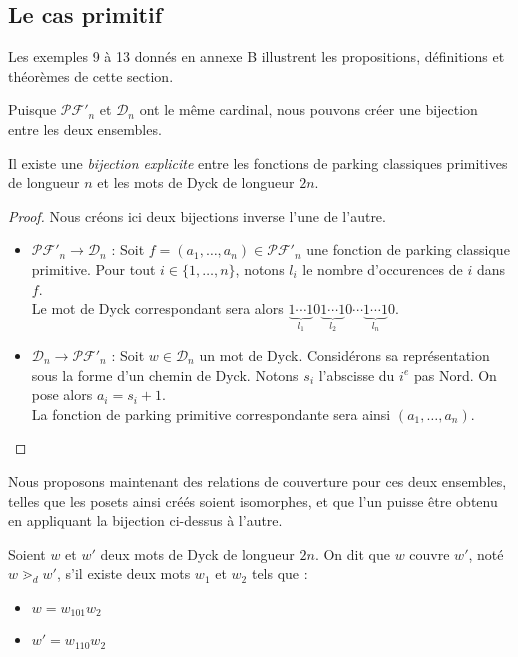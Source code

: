 \subsection{Le cas primitif}

Les exemples 9 à 13 donnés en annexe B illustrent les propositions,
définitions et théorèmes de cette section.

Puisque $\mathcal{PF'}_n$ et $\mathcal{D}_n$ ont le même cardinal,
nous pouvons créer une bijection entre les deux ensembles.

\begin{prop}
    Il existe une \emph{bijection explicite} entre les fonctions de parking
    classiques primitives de longueur $n$ et les mots de Dyck de
    longueur $2n$.
\end{prop}

\begin{proof}
    Nous créons ici deux bijections inverse l'une de l'autre.
\begin{itemize}
    \item $\mathcal{PF'}_n \to \mathcal{D}_n$ :
    Soit $f = (a_1, \ldots, a_n) \in \mathcal{PF'}_n$
    une fonction de parking classique primitive.
    Pour tout $i \in \{1, \ldots, n\}$, notons $l_i$ le nombre
    d'occurences de $i$ dans $f$.\\
    Le mot de Dyck correspondant sera alors
    $\underbrace{1 \cdots 1}_{l_1}0
     \underbrace{1 \cdots 1}_{l_2}0 \cdots
     \underbrace{1 \cdots 1}_{l_n}0$.
    
    \item $\mathcal{D}_n \to \mathcal{PF'}_n$ :
    Soit $w \in \mathcal{D}_n$ un mot de Dyck. Considérons sa
    représentation sous la forme d'un chemin de Dyck.
    Notons $s_i$ l'abscisse du $i^{e}$ pas Nord.
    On pose alors $a_i = s_i + 1$.\\
    La fonction de parking primitive correspondante sera ainsi
    $(a_1, \ldots, a_n)$.
\end{itemize}
\end{proof}

Nous proposons maintenant des relations de couverture pour ces deux
ensembles, telles que les posets ainsi créés soient isomorphes, et que 
l'un puisse être obtenu en appliquant la bijection ci-dessus à l'autre.

\begin{definition}[$\gtrdot_d$]
    Soient $w$ et $w'$ deux mots de Dyck de longueur $2n$.
    On dit que $w$ couvre $w'$, noté $w \gtrdot_d w'$, s'il existe deux
    mots $w_1$ et $w_2$ tels que :
    \begin{itemize}
        \item $w = w_101w_2$
        \item $w' = w_110w_2$
    \end{itemize}  
\end{definition}

